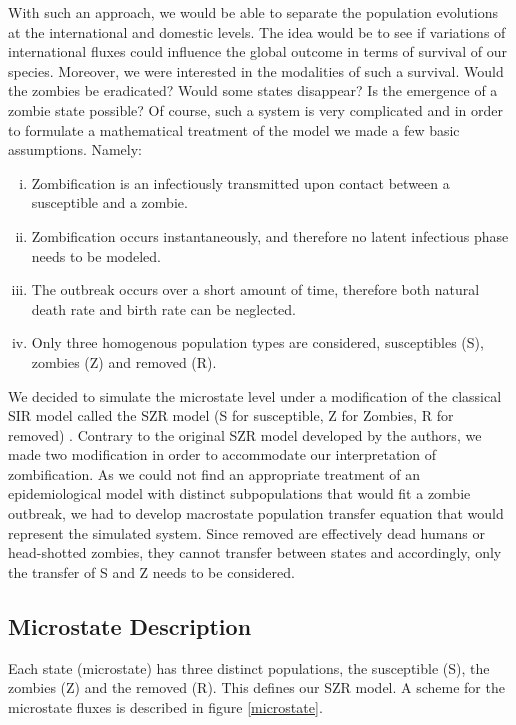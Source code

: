 \documentclass[11pt]{article} %
\begin{document}
With such an approach, we would be able to separate the population evolutions at the international and domestic levels. The idea would be to see if variations of international fluxes could influence the global outcome in terms of survival of our species. Moreover, we were interested in the modalities of such a survival. Would the zombies be eradicated? Would some states disappear? Is the emergence of a zombie state possible? Of course, such a system is very complicated and in order to formulate a mathematical treatment of the model we made a few basic assumptions. Namely:
\begin{enumerate}[i.]
	\item Zombification is an infectiously transmitted upon contact between a susceptible and a zombie.
	\item Zombification occurs instantaneously, and therefore no latent infectious phase needs to be modeled.
	\item The outbreak occurs over a short amount of time, therefore both natural death rate and birth rate can be neglected.
	\item Only three homogenous population types are considered, susceptibles (S), zombies (Z) and removed (R).
\end{enumerate}

We decided to simulate the microstate level under a modification of the classical SIR model called the SZR model (S for susceptible, Z for Zombies, R for removed) \cite{munz2009zombies}. Contrary to the original SZR model developed by the authors, we made two modification in order to accommodate our interpretation of zombification. As we could not find an appropriate treatment of an epidemiological model with distinct subpopulations that would fit a zombie outbreak, we had to develop macrostate population transfer equation that would represent the simulated system. Since removed are effectively dead humans or head-shotted zombies, they cannot transfer between states and accordingly, only the transfer of S and Z needs to be considered. 

\subsection{Microstate Description}\indent
\label{sec:microdescription}

Each state (microstate) has three distinct populations, the susceptible (S), the zombies (Z) and the removed (R). This defines our SZR model. A scheme for the microstate fluxes is described in figure \ref{microstate}.
\end{document}
